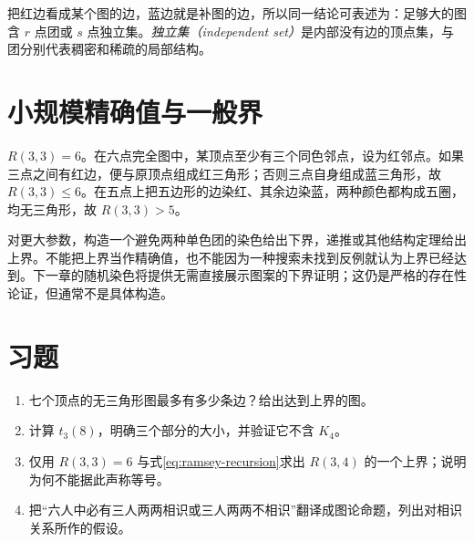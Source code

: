 把红边看成某个图的边，蓝边就是补图的边，所以同一结论可表述为：足够大的图含 $r$ 点团或 $s$ 点独立集。\emph{独立集（independent set）}是内部没有边的顶点集，与团分别代表稠密和稀疏的局部结构。

\section{小规模精确值与一般界}

\begin{example}
$R(3,3)=6$。在六点完全图中，某顶点至少有三个同色邻点，设为红邻点。如果三点之间有红边，便与原顶点组成红三角形；否则三点自身组成蓝三角形，故 $R(3,3)\le6$。在五点上把五边形的边染红、其余边染蓝，两种颜色都构成五圈，均无三角形，故 $R(3,3)>5$。
\end{example}

对更大参数，构造一个避免两种单色团的染色给出下界，递推或其他结构定理给出上界。不能把上界当作精确值，也不能因为一种搜索未找到反例就认为上界已经达到。下一章的随机染色将提供无需直接展示图案的下界证明；这仍是严格的存在性论证，但通常不是具体构造。

\section{习题}
\begin{enumerate}
  \item\label{ex:extremal-ramsey-1} 七个顶点的无三角形图最多有多少条边？给出达到上界的图。
  \item\label{ex:extremal-ramsey-2} 计算 $t_3(8)$，明确三个部分的大小，并验证它不含 $K_4$。
  \item\label{ex:extremal-ramsey-3} 仅用 $R(3,3)=6$ 与式\eqref{eq:ramsey-recursion}求出 $R(3,4)$ 的一个上界；说明为何不能据此声称等号。
  \item\label{ex:extremal-ramsey-4} 把“六人中必有三人两两相识或三人两两不相识”翻译成图论命题，列出对相识关系所作的假设。
\end{enumerate}

